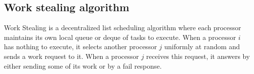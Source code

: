 %


\subsection{Work stealing algorithm}

Work Stealing is a decentralized list scheduling algorithm where each
processor maintains its own local queue or deque of tasks to
execute. When a processor $i$ has nothing to execute, it selects
another processor $j$ uniformly at random and sends a work request to
it. When a processor $j$ receives this request, it answers by either
sending some of its work or by a fail response. 

